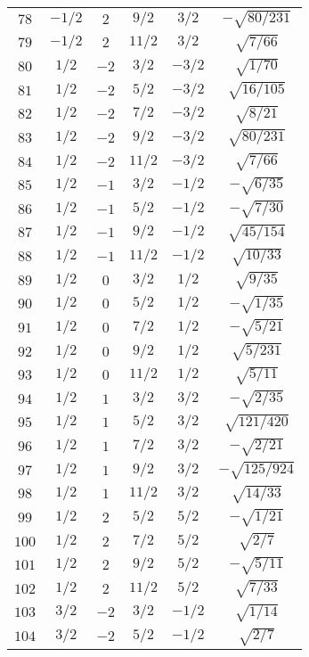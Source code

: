 \begin{table}
\begin{center}
\begin{tabular}{|c|c|c|c|c|c|}
$78$ & $-1/2$ & $2$ & $9/2$ & $3/2$ & $-\sqrt{80/231}$ \\ 
$79$ & $-1/2$ & $2$ & $11/2$ & $3/2$ & $\sqrt{7/66}$ \\ 
$80$ & $1/2$ & $-2$ & $3/2$ & $-3/2$ & $\sqrt{1/70}$ \\ 
$81$ & $1/2$ & $-2$ & $5/2$ & $-3/2$ & $\sqrt{16/105}$ \\ 
$82$ & $1/2$ & $-2$ & $7/2$ & $-3/2$ & $\sqrt{8/21}$ \\ 
$83$ & $1/2$ & $-2$ & $9/2$ & $-3/2$ & $\sqrt{80/231}$ \\ 
$84$ & $1/2$ & $-2$ & $11/2$ & $-3/2$ & $\sqrt{7/66}$ \\ 
$85$ & $1/2$ & $-1$ & $3/2$ & $-1/2$ & $-\sqrt{6/35}$ \\ 
$86$ & $1/2$ & $-1$ & $5/2$ & $-1/2$ & $-\sqrt{7/30}$ \\ 
$87$ & $1/2$ & $-1$ & $9/2$ & $-1/2$ & $\sqrt{45/154}$ \\ 
$88$ & $1/2$ & $-1$ & $11/2$ & $-1/2$ & $\sqrt{10/33}$ \\ 
$89$ & $1/2$ & $0$ & $3/2$ & $1/2$ & $\sqrt{9/35}$ \\ 
$90$ & $1/2$ & $0$ & $5/2$ & $1/2$ & $-\sqrt{1/35}$ \\ 
$91$ & $1/2$ & $0$ & $7/2$ & $1/2$ & $-\sqrt{5/21}$ \\ 
$92$ & $1/2$ & $0$ & $9/2$ & $1/2$ & $\sqrt{5/231}$ \\ 
$93$ & $1/2$ & $0$ & $11/2$ & $1/2$ & $\sqrt{5/11}$ \\ 
$94$ & $1/2$ & $1$ & $3/2$ & $3/2$ & $-\sqrt{2/35}$ \\ 
$95$ & $1/2$ & $1$ & $5/2$ & $3/2$ & $\sqrt{121/420}$ \\ 
$96$ & $1/2$ & $1$ & $7/2$ & $3/2$ & $-\sqrt{2/21}$ \\ 
$97$ & $1/2$ & $1$ & $9/2$ & $3/2$ & $-\sqrt{125/924}$ \\ 
$98$ & $1/2$ & $1$ & $11/2$ & $3/2$ & $\sqrt{14/33}$ \\ 
$99$ & $1/2$ & $2$ & $5/2$ & $5/2$ & $-\sqrt{1/21}$ \\ 
$100$ & $1/2$ & $2$ & $7/2$ & $5/2$ & $\sqrt{2/7}$ \\ 
$101$ & $1/2$ & $2$ & $9/2$ & $5/2$ & $-\sqrt{5/11}$ \\ 
$102$ & $1/2$ & $2$ & $11/2$ & $5/2$ & $\sqrt{7/33}$ \\ 
$103$ & $3/2$ & $-2$ & $3/2$ & $-1/2$ & $\sqrt{1/14}$ \\ 
$104$ & $3/2$ & $-2$ & $5/2$ & $-1/2$ & $\sqrt{2/7}$ \\ 

\end{tabular}
\end{center}
\end{table}
